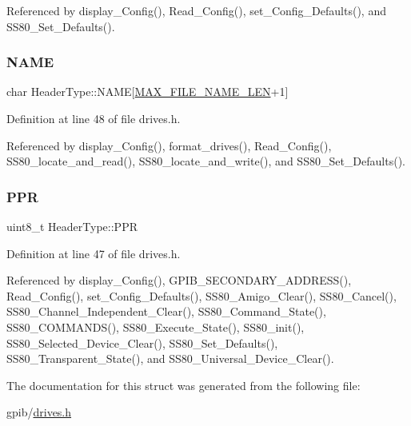 Referenced by display\+\_\+\+Config(), Read\+\_\+\+Config(), set\+\_\+\+Config\+\_\+\+Defaults(), and S\+S80\+\_\+\+Set\+\_\+\+Defaults().

\mbox{\label{structHeaderType_aac997fd2dc536b10072137ecaf1fd0b4}} 
\subsubsection{\texorpdfstring{N\+A\+ME}{NAME}}
{\footnotesize\ttfamily char Header\+Type\+::\+N\+A\+ME\mbox{[}\hyperlink{drives_8h_a835262f9c26026aab5f91a528f57ad8f}{M\+A\+X\+\_\+\+F\+I\+L\+E\+\_\+\+N\+A\+M\+E\+\_\+\+L\+EN}+1\mbox{]}}



Definition at line 48 of file drives.\+h.



Referenced by display\+\_\+\+Config(), format\+\_\+drives(), Read\+\_\+\+Config(), S\+S80\+\_\+locate\+\_\+and\+\_\+read(), S\+S80\+\_\+locate\+\_\+and\+\_\+write(), and S\+S80\+\_\+\+Set\+\_\+\+Defaults().

\mbox{\label{structHeaderType_ac642cdad0f3874495afa0ab687a56fd0}} 
\subsubsection{\texorpdfstring{P\+PR}{PPR}}
{\footnotesize\ttfamily uint8\+\_\+t Header\+Type\+::\+P\+PR}



Definition at line 47 of file drives.\+h.



Referenced by display\+\_\+\+Config(), G\+P\+I\+B\+\_\+\+S\+E\+C\+O\+N\+D\+A\+R\+Y\+\_\+\+A\+D\+D\+R\+E\+S\+S(), Read\+\_\+\+Config(), set\+\_\+\+Config\+\_\+\+Defaults(), S\+S80\+\_\+\+Amigo\+\_\+\+Clear(), S\+S80\+\_\+\+Cancel(), S\+S80\+\_\+\+Channel\+\_\+\+Independent\+\_\+\+Clear(), S\+S80\+\_\+\+Command\+\_\+\+State(), S\+S80\+\_\+\+C\+O\+M\+M\+A\+N\+D\+S(), S\+S80\+\_\+\+Execute\+\_\+\+State(), S\+S80\+\_\+init(), S\+S80\+\_\+\+Selected\+\_\+\+Device\+\_\+\+Clear(), S\+S80\+\_\+\+Set\+\_\+\+Defaults(), S\+S80\+\_\+\+Transparent\+\_\+\+State(), and S\+S80\+\_\+\+Universal\+\_\+\+Device\+\_\+\+Clear().



The documentation for this struct was generated from the following file\+:\begin{DoxyCompactItemize}
\item 
gpib/\hyperlink{drives_8h}{drives.\+h}\end{DoxyCompactItemize}
